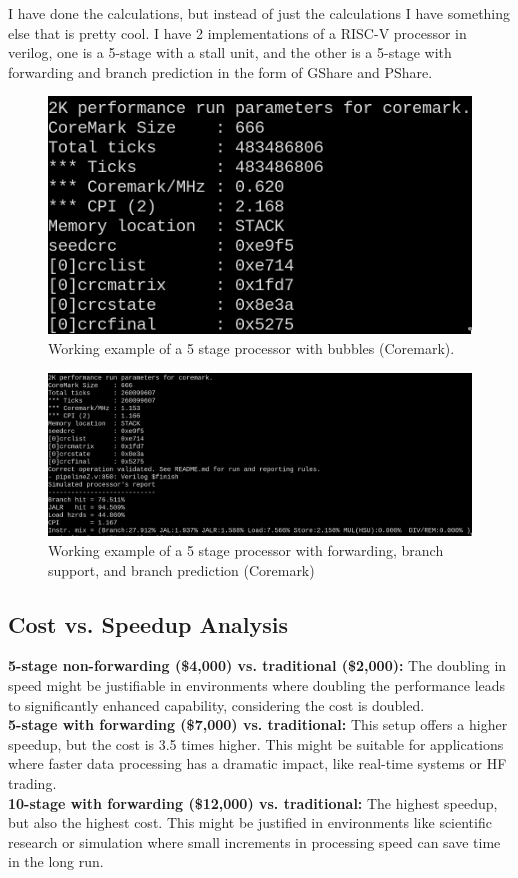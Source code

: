 \documentclass[11pt]{article}
\begin{document}
I have done the calculations, but instead of just the calculations I have something else that is pretty cool. I have 2 implementations of a RISC-V processor in verilog, one is a 5-stage with a stall unit, and the other is a 5-stage with forwarding and branch prediction in the form of GShare and PShare. 
\\
\begin{figure}
	\centering
	\includegraphics[width=0.7\linewidth]{screenshot001}
	\caption{Working example of a 5 stage processor with bubbles (Coremark).}
	\label{fig:screenshot001}
\end{figure}
\begin{figure}
	\centering
	\includegraphics[width=0.7\linewidth]{screenshot002}
	\caption{Working example of a 5 stage processor with forwarding, branch support, and branch prediction (Coremark)}
	\label{fig:screenshot002}
\end{figure}
\subsection*{Cost vs. Speedup Analysis}

\textbf{5-stage non-forwarding (\$4,000) vs. traditional (\$2,000):} The doubling in speed might be justifiable in environments where doubling the performance leads to significantly enhanced capability, considering the cost is doubled.\\
\textbf{5-stage with forwarding (\$7,000) vs. traditional:} This setup offers a higher speedup, but the cost is 3.5 times higher. This might be suitable for applications where faster data processing has a dramatic impact, like real-time systems or HF trading.\\
\textbf{10-stage with forwarding (\$12,000) vs. traditional:} The highest speedup, but also the highest cost. This might be justified in environments like scientific research or simulation where small increments in processing speed can save time in the long run.\\
\end{document}
